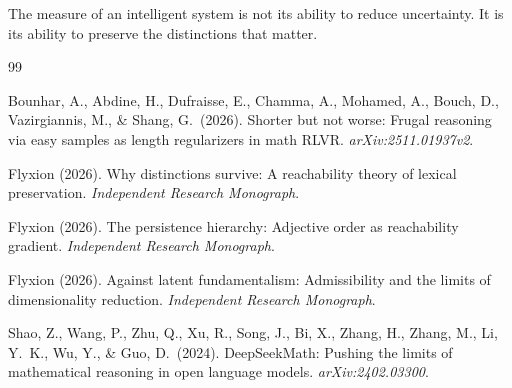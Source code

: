 \documentclass[11pt]{article}
\theoremstyle{rthm}
\theoremstyle{rdef}
\theoremstyle{remark}
\begin{document}
The measure of an intelligent system is not its ability to reduce
uncertainty. It is its ability to preserve the distinctions that
matter.

\begin{thebibliography}{99}

Bounhar, A., Abdine, H., Dufraisse, E., Chamma, A., Mohamed, A.,
Bouch, D., Vazirgiannis, M., \& Shang, G.\ (2026).
Shorter but not worse: Frugal reasoning via easy samples as length
regularizers in math RLVR.
\textit{arXiv:2511.01937v2}.

Flyxion (2026).
Why distinctions survive: A reachability theory of lexical preservation.
\textit{Independent Research Monograph}.

Flyxion (2026).
The persistence hierarchy: Adjective order as reachability gradient.
\textit{Independent Research Monograph}.

Flyxion (2026).
Against latent fundamentalism: Admissibility and the limits of
dimensionality reduction.
\textit{Independent Research Monograph}.

Shao, Z., Wang, P., Zhu, Q., Xu, R., Song, J., Bi, X., Zhang, H.,
Zhang, M., Li, Y.\ K., Wu, Y., \& Guo, D.\ (2024).
DeepSeekMath: Pushing the limits of mathematical reasoning in open
language models.
\textit{arXiv:2402.03300}.

\end{thebibliography}
\end{document}

